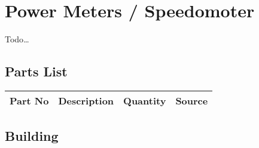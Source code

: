 \documentclass[11pt]{article}
\begin{document}
\pagebreak
\section{Power Meters / Speedomoter}

Todo{\dots}

\subsection{Parts List}

\begin{tabular}{|c|l|c|c|}
\hline
Part No	&  Description			&  Quantity	& Source \\
\hline
\hline
\end{tabular}

\subsection{Building}
\end{document}
